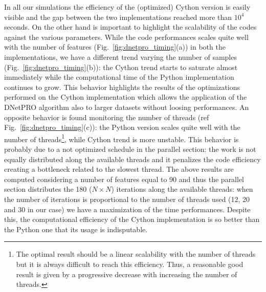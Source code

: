 \documentclass{standalone}
\begin{document}
In all our simulations the efficiency of the (optimized) Cython version is easily visible and the gap between the two implementations reached more than $10^4$ seconds.
On the other hand is important to highlight the scalability of the codes against the various parameters.
While the code performances scales quite well with the number of features (Fig.~\ref{fig:dnetpro_timing}(a)) in both the implementations, we have a different trend varying the number of samples (Fig.~\ref{fig:dnetpro_timing}(b)): the Cython trend starts to saturate almost immediately while the computational time of the \textsf{Python} implementation continues to grow.
This behavior highlights the results of the optimizations performed on the Cython implementation which allows the application of the DNetPRO algorithm also to larger datasets without loosing performances.
An opposite behavior is found monitoring the number of threads (ref Fig.~\ref{fig:dnetpro_timing}(c)): the \textsf{Python} version scales quite well with the number of threads\footnote{
  The optimal result should be a linear scalability with the number of threads but it is always difficult to reach this efficiency.
  Thus, a reasonable good result is given by a progressive decrease with increasing the number of threads.
}, while Cython trend is more unstable.
This behavior is probably due to a not optimized schedule in the parallel section: the work is not equally distributed along the available threads and it penalizes the code efficiency creating a bottleneck related to the slowest thread.
The above results are computed considering a number of features equal to 90 and thus the parallel section distributes the 180 ($N\times N$) iterations along the available threads: when the number of iterations is proportional to the number of threads used (12, 20 and 30 in our case) we have a maximization of the time performances.
Despite this, the computational efficiency of the Cython implementation is so better than the \textsf{Python} one that its usage is indisputable.
\end{document}
